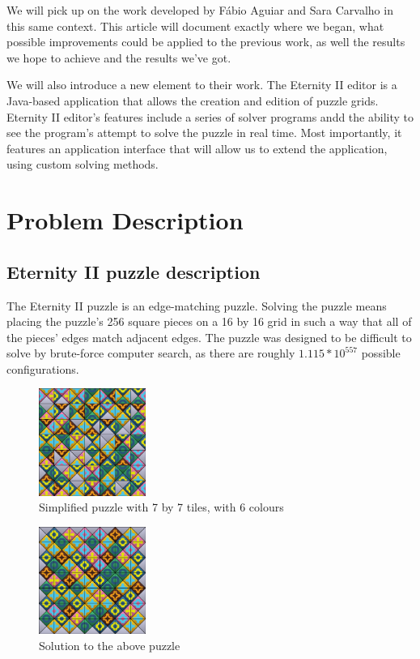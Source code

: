\documentclass{llncs}
\begin{document}
We will pick up on the work developed by Fábio Aguiar and Sara Carvalho in this same context. This article will document exactly where we began, what possible improvements could be applied to the previous work, as well the results we hope to achieve and the results we've got.

We will also introduce a new element to their work. The Eternity II editor is a Java-based application that allows the creation and edition of puzzle grids. Eternity II editor's features include a series of solver programs andd the ability to see the program's attempt to solve the puzzle in real time. Most importantly, it features an application interface that will allow us to extend the application, using custom solving methods.

\section{Problem Description}

\subsection{Eternity II puzzle description}

The Eternity II puzzle is an edge-matching puzzle. Solving the puzzle means placing the puzzle's 256 square pieces on a 16 by 16  grid in such a way that all of the pieces' edges match adjacent edges. The puzzle was designed to be difficult to solve by brute-force computer search, as there are roughly $1.115 * 10 ^ {557}$ possible configurations.

\begin{figure}[h]
	\centering
	\includegraphics[width=35mm]{images/shuffled.png}
	\caption{Simplified puzzle with 7 by 7 tiles, with 6 colours}
	\label{fig:shuffled_example}
\end{figure}

\begin{figure}[h]
	\centering
	\includegraphics[width=35mm]{images/solved.png}
	\caption{Solution to the above puzzle}
	\label{fig:solved_example}
\end{figure}
\end{document}
